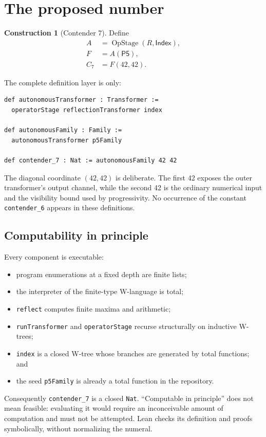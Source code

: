 \documentclass[11pt]{article}
\theoremstyle{definition}
\newtheorem{construction}[theorem]{Construction}
\theoremstyle{remark}
\newcommand{\OpStage}{\operatorname{OpStage}}
\newcommand{\Index}{\mathsf{Index}}
\newcommand{\Pfive}{\mathsf{P5}}
\newcommand{\lean}[1]{\texttt{#1}}
\begin{document}
\section{The proposed number}
\label{sec:number}

\begin{construction}[Contender 7]
Define
\[
\begin{aligned}
  A &= \OpStage(R,\Index),\\
  F &= A(\Pfive),\\
  C_7 &= F(42,42).
\end{aligned}
\]
\end{construction}

The complete definition layer is only:
\begin{lstlisting}
def autonomousTransformer : Transformer :=
  operatorStage reflectionTransformer index

def autonomousFamily : Family :=
  autonomousTransformer p5Family

def contender_7 : Nat := autonomousFamily 42 42
\end{lstlisting}
The diagonal coordinate \((42,42)\) is deliberate.  The first 42 exposes the
outer transformer's output channel, while the second 42 is the ordinary
numerical input and the visibility bound used by progressivity.  No occurrence
of the constant \lean{contender\_6} appears in these definitions.

\subsection{Computability in principle}

Every component is executable:
\begin{itemize}[leftmargin=*]
  \item program enumerations at a fixed depth are finite lists;
  \item the interpreter of the finite-type W-language is total;
  \item \lean{reflect} computes finite maxima and arithmetic;
  \item \lean{runTransformer} and \lean{operatorStage} recurse structurally on
        inductive W-trees;
  \item \lean{index} is a closed W-tree whose branches are generated by total
        functions; and
  \item the seed \lean{p5Family} is already a total function in the repository.
\end{itemize}
Consequently \lean{contender\_7} is a closed \lean{Nat}.  ``Computable in
principle'' does not mean feasible: evaluating it would require an
inconceivable amount of computation and must not be attempted.  Lean checks
its definition and proofs symbolically, without normalizing the numeral.
\end{document}
